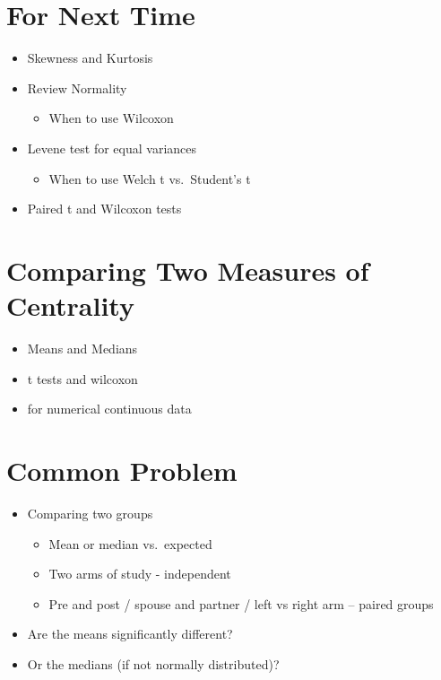 \documentclass[
]{book}
\providecommand{\tightlist}{%
  \setlength{\itemsep}{0pt}\setlength{\parskip}{0pt}}
\begin{document}
\hypertarget{for-next-time}{%
\section{For Next Time}\label{for-next-time}}

\begin{itemize}
\tightlist
\item
  Skewness and Kurtosis
\item
  Review Normality

  \begin{itemize}
  \tightlist
  \item
    When to use Wilcoxon
  \end{itemize}
\item
  Levene test for equal variances

  \begin{itemize}
  \tightlist
  \item
    When to use Welch t vs.~Student's t
  \end{itemize}
\item
  Paired t and Wilcoxon tests
\end{itemize}

\hypertarget{comparing-two-measures-of-centrality-1}{%
\section{Comparing Two Measures of Centrality}\label{comparing-two-measures-of-centrality-1}}

\begin{itemize}
\tightlist
\item
  Means and Medians
\item
  t tests and wilcoxon
\item
  for numerical continuous data
\end{itemize}

\hypertarget{common-problem-1}{%
\section{Common Problem}\label{common-problem-1}}

\begin{itemize}
\tightlist
\item
  Comparing two groups

  \begin{itemize}
  \tightlist
  \item
    Mean or median vs.~expected
  \item
    Two arms of study - independent
  \item
    Pre and post / spouse and partner / left vs right arm -- paired groups
  \end{itemize}
\item
  Are the means significantly different?
\item
  Or the medians (if not normally distributed)?
\end{itemize}
\end{document}

